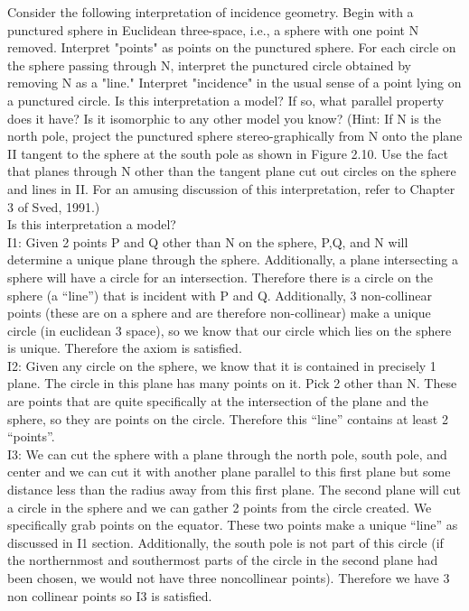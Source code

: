 \documentclass[12pt,letterpaper]{article}
\newcommand{\prob}[1]{\newpage\noindent {\bf #1}}
\begin{document}
 
 
\prob{Major Exercise 1} Consider the following interpretation of incidence geometry.  Begin with a punctured sphere in Euclidean three-space, i.e., a sphere with one point N removed.  Interpret "points" as points on the punctured sphere.  For each circle on the sphere passing through N, interpret the punctured circle obtained by removing N as a "line." Interpret "incidence" in the usual sense of a point lying on a punctured circle.  Is this interpretation a model?  If so, what parallel property does it have?  Is it isomorphic to any other model you know?  (Hint: If N is the north pole, project the punctured sphere stereo-graphically from N onto the plane II tangent to the sphere at the south pole as shown in Figure 2.10.  Use the fact that planes through N other than the tangent plane cut out circles on the sphere and lines in II.  For an amusing discussion of this interpretation, refer to Chapter 3 of Sved, 1991.)\\

Is this interpretation a model?\\

I1:   Given 2 points P and Q other than N on the sphere, P,Q, and N will determine a unique plane through the sphere.  Additionally, a plane intersecting a sphere will have a circle for an intersection.  Therefore there is a circle on the sphere (a ``line'') that is incident with P and Q.  Additionally, 3 non-collinear points (these are on a sphere and are therefore non-collinear) make a unique circle (in euclidean 3 space), so we know that our circle which lies on the sphere is unique.  Therefore the axiom is satisfied.\\

I2: Given any circle on the sphere, we know that it is contained in precisely 1 plane.  The circle in this plane has many points on it.  Pick 2 other than N.  These are points that are quite specifically at the intersection of the plane and the sphere, so they are points on the circle.  Therefore this ``line'' contains at least 2 ``points''.\\

I3: We can cut the sphere with a plane through the north pole, south pole, and center and we can cut it with another plane parallel to this first plane but some distance less than the radius away from this first plane.  The second plane will cut a circle in the sphere and we can gather 2 points from the circle created.  We specifically grab points on the equator.  These two points make a unique ``line'' as discussed in I1 section. Additionally, the south pole is not part of this circle (if the northernmost and southermost parts of the circle in the second plane had been chosen, we would not have three noncollinear points).  Therefore we have 3 non collinear points so I3 is satisfied.\\
\end{document}
